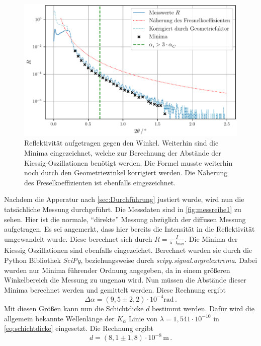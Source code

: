 \begin{figure}
    \centering
    \includegraphics[width = 0.8 \linewidth]{build/messung1.pdf}
    \caption{Reflektivität aufgetragen gegen den Winkel.
    Weiterhin sind die Minima eingezeichnet, welche zur Berechnung der Abstände der Kiessig-Oszillationen benötigt werden.
    Die Formel musste weiterhin noch durch den Geometriewinkel korrigiert werden.
    Die Näherung des Freselkoeffizienten ist ebenfalls eingezeichnet.}
    \label{fig:messreihe1}
\end{figure}

Nachdem die Apperatur nach \autoref{sec:Durchführung} justiert wurde, wird nun die tatsächliche Messung durchgeführt.
Die Messdaten sind in \autoref{fig:messreihe1} zu sehen.
Hier ist die normale, \enquote{direkte} Messung abzüglich der diffusen Messung aufgetragen.
Es sei angemerkt, dass hier bereits die Intensität in die Reflektivität umgewandelt wurde.
Diese berechnet sich durch $R = \frac{I}{ 5 \cdot I_\text{max}}$.
Die Minima der Kiessig Oszillationen sind ebenfalls eingezeichet.
Berechnet wurden sie durch die Python Bibliothek \textit{SciPy}, beziehungsweise durch \textit{scipy.signal.argrelextrema}.
Dabei wurden nur Minima führender Ordnung angegeben, da in einem größeren Winkelbereich die Messung zu ungenau wird.
Nun müssen die Abstände dieser Minima berechnet werden und gemittelt werden.
Diese Rechnung ergibt
\begin{equation*}
    \Delta \alpha = (9{,}5 \pm 2{,}2) \cdot 10^{-4} \unit\radian \, .
\end{equation*}
Mit diesen Größen kann nun die Schichtdicke $d$ bestimmt werden.
Dafür wird die allgemein bekannte Wellenlänge der $K_\alpha$ Linie von $\lambda = 1{,}541 \cdot 10^{-10}$ in \autoref{eq:schichtdicke} eingesetzt.
Die Rechnung ergibt
\begin{equation*}
    d = (8{,}1 \pm 1{,}8) \cdot 10^{-8} \, \unit\meter \, .
\end{equation*}

